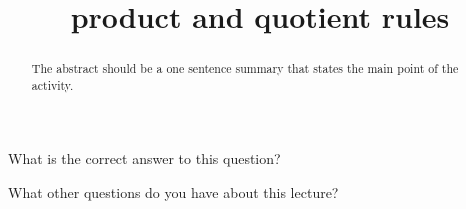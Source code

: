 \documentclass{ximera}
\title{product and quotient rules}
\begin{document}
\begin{abstract}
  The abstract should be a one sentence summary that states the main point of the activity.
\end{abstract}

\maketitle

\begin{question}
  What is the correct answer to this question?

  
    \begin{multipleChoice}
    \end{multipleChoice}  
  
\end{question}

What other questions do you have about this lecture?
\begin{question}
  \begin{freeResponse}
  \end{freeRepsonse}
\end{question}
\end{document}
